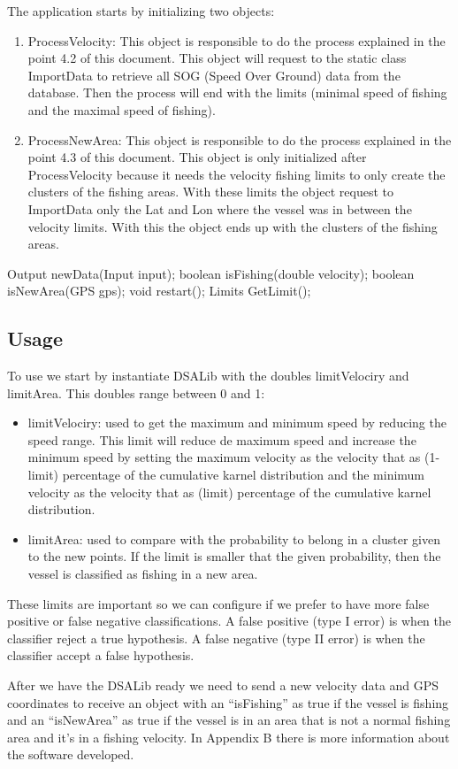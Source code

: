 The application starts by initializing two objects:
\begin{enumerate}
\item	ProcessVelocity: This object is responsible to do the process explained in the point 4.2 of this document. This object will request to the static class ImportData to retrieve all SOG (Speed Over Ground) data from the database. Then the process will end with the limits (minimal speed of fishing and the maximal speed of fishing).
\item	ProcessNewArea: This object is responsible to do the process explained in the point 4.3 of this document. This object is only initialized after ProcessVelocity because it needs the velocity fishing limits to only create the clusters of the fishing areas. With these limits the object request to ImportData only the Lat and Lon where the vessel was in between the velocity limits. With this the object ends up with the clusters of the fishing areas.
\end{enumerate}


Output newData(Input input);
boolean isFishing(double velocity);
boolean isNewArea(GPS gps);
void restart();
Limits GetLimit(); 

\subsection{Usage} %
\label{sub:usage}
To use we start by instantiate DSALib with the doubles limitVelociry and limitArea. This doubles range between 0 and 1:
\begin{itemize}
\item	limitVelociry: used to get the maximum and minimum speed by reducing the speed range. This limit will reduce de maximum speed and increase the minimum speed by setting the maximum velocity as the velocity that as (1-limit) percentage of the cumulative karnel distribution and the minimum velocity as the velocity that as (limit) percentage of the cumulative karnel distribution.
\item	limitArea: used to compare with the probability to belong in a cluster given to the new points. If the limit is smaller that the given probability, then the vessel is classified as fishing in a new area.
\end{itemize}
These limits are important so we can configure if we prefer to have more false positive or false negative classifications.
A false positive (type I error) is when the classifier reject a true hypothesis.
A false negative (type II error) is when the classifier accept a false hypothesis.

After we have the DSALib ready we need to send a new velocity data and GPS coordinates to receive an object with an “isFishing” as true if the vessel is fishing and an “isNewArea” as true if the vessel is in an area that is not a normal fishing area and it’s in a fishing velocity. In Appendix B there is more information about the software developed.





